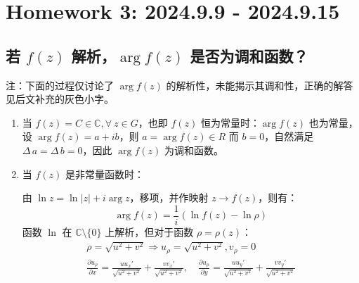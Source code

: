 \documentclass[UTF8]{report}
\def\C{\mathbb{C}}
\theoremstyle{MyLineTheoremStyle} %
\theoremstyle{MyBlockTheoremStyle} %
\theoremstyle{MySubsubsectionStyle} %
\begin{document}
\chapter{Homework 3: 2024.9.9 - 2024.9.15}
\thispagestyle{fancy}

\section{若 $f(z)$ 解析，$\arg f(z)$ 是否为调和函数？}

{\par\color{gray}\small
注：下面的过程仅讨论了 $\arg f(z)$ 的解析性，未能揭示其调和性，正确的解答见后文补充的灰色小字。
\par}


\begin{enumerate}
\item 当 $f(z) = C \in \C, \forall\ z \in G$，也即 $f(z)$ 恒为常量时：$\arg f(z)$ 也为常量，设 $\arg f(z) = a + ib$，则 $a = \arg f(z) \in R$ 而 $b=0$，自然满足 $\Delta\, a = \Delta\, b =0$，因此 $\arg f(z)$ 为调和函数。
\item 当 $f(z)$ 是非常量函数时：

由 $\ln z = \ln | z | + i\arg z$，移项，并作映射 $z \to f(z)$，则有：
\begin{equation*}
\arg f(z) = \frac{1}{i}\left(\ln f(z) - \ln \rho\right)
\end{equation*}
函数 $\ln$ 在 $\C \setminus \{0\}$ 上解析，但对于函数 $\rho = \rho(z)$：
\begin{gather}
\rho = \sqrt{u^2 + v^2}\Longrightarrow u_\rho = \sqrt{u^2+v^2}, v_\rho = 0  \\ 
\frac{\partial u_\rho }{\partial x }
= \frac{uu_x'}{\sqrt{u^2+v^2} } + \frac{vv_x'}{\sqrt{u^2+v^2} },\quad \frac{\partial u_\rho }{\partial y } = \frac{uu_y'}{\sqrt{u^2+v^2} } + \frac{vv_y'}{\sqrt{u^2+v^2} }
\end{gather}


\end{enumerate}
\end{document}
